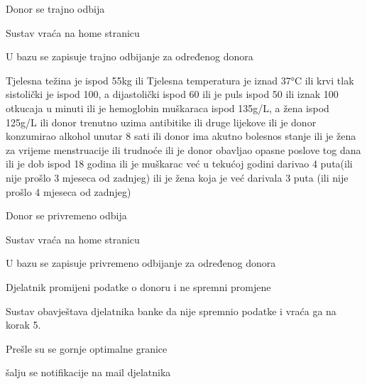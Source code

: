 \begin{packed_item}
\begin{packed_item}
\begin{packed_enum}
			\item Donor se trajno odbija
			\item Sustav vraća na home stranicu
			\item U bazu se zapisuje trajno odbijanje za određenog donora
		\end{packed_enum}
\eject
		\item[4.b] {Tjelesna težina je ispod 55kg ili Tjelesna temperatura je iznad 37°C ili krvi tlak sistolički je ispod 100, a dijastolički ispod 60 ili je puls ispod 50 ili iznak 100 otkucaja u minuti ili je hemoglobin muškaraca ispod 135g/L, a žena ispod 125g/L ili donor trenutno uzima antibitike ili druge lijekove ili je donor konzumirao alkohol unutar 8 sati  ili donor ima akutno bolesnos stanje ili je žena za vrijeme menstruacije ili trudnoće ili je donor obavljao opasne poslove tog dana ili je dob ispod 18 godina ili je muškarac već u tekućoj godini darivao 4 puta(ili nije prošlo 3 mjeseca od zadnjeg) ili je žena koja je već darivala 3 puta (ili nije prošlo 4 mjeseca od zadnjeg)}
		\item[] \begin{packed_enum}
			
			\item Donor se privremeno odbija
			\item Sustav vraća na home stranicu
			\item U bazu se zapisuje privremeno odbijanje za određenog donora
			\end{packed_enum}
		\item[5.a] {Djelatnik promijeni podatke o donoru i ne spremni promjene}
		\item[] \begin{packed_enum}
			
			\item Sustav obavještava djelatnika banke da nije spremnio podatke i vraća ga na korak 5.
			\end{packed_enum}
		\item[8.a] {Prešle su se gornje optimalne granice}
		\item[] \begin{packed_enum}
			
			\item šalju se notifikacije na mail djelatnika
			
		\end{packed_enum}
	\end{packed_item}
	
\end{packed_item}
\eject 

